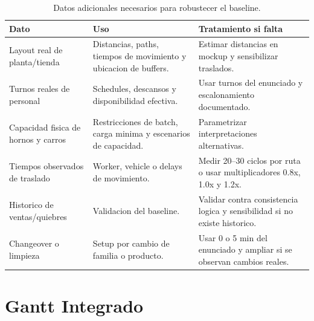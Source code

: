 \documentclass[12pt]{article}
\begin{document}
\begin{table}[H]
\centering
\caption{Datos adicionales necesarios para robustecer el baseline.}
\begin{tabularx}{\textwidth}{L{3.7cm}Y L{3.5cm}}
\toprule
{}
\color{white}Dato & \color{white}Uso & \color{white}Tratamiento si falta \\
\midrule
Layout real de planta/tienda & Distancias, paths, tiempos de movimiento y ubicacion de buffers. & Estimar distancias en mockup y sensibilizar traslados. \\
Turnos reales de personal & Schedules, descansos y disponibilidad efectiva. & Usar turnos del enunciado y escalonamiento documentado. \\
Capacidad fisica de hornos y carros & Restricciones de batch, carga minima y escenarios de capacidad. & Parametrizar interpretaciones alternativas. \\
Tiempos observados de traslado & Worker, vehicle o delays de movimiento. & Medir 20--30 ciclos por ruta o usar multiplicadores 0.8x, 1.0x y 1.2x. \\
Historico de ventas/quiebres & Validacion del baseline. & Validar contra consistencia logica y sensibilidad si no existe historico. \\
Changeover o limpieza & Setup por cambio de familia o producto. & Usar 0 o 5 min del enunciado y ampliar si se observan cambios reales. \\
\bottomrule
\end{tabularx}
\end{table}

\section{Gantt Integrado}
\end{document}
